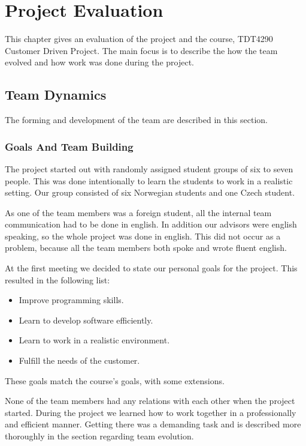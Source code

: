 \chapter{Project Evaluation}
This chapter gives an evaluation of the project and the course, TDT4290 Customer Driven Project. The main focus is to describe the how the team evolved and how work was done during the project.   

\section{Team Dynamics}
The forming and development of the team are described in this section.
\subsection{Goals And Team Building}
The project started out with randomly assigned student groups of six to seven people. This was done intentionally to learn the students to work in a realistic setting. Our group consisted of six Norwegian students and one Czech student. 

As one of the team members was a foreign student, all the internal team communication had to be done in english. In addition our advisors were english speaking, so the whole project was done in english. This did not occur as a problem, because all the team members both spoke and wrote fluent english.

At the first meeting we decided to state our personal goals for the project. This resulted in the following list:
\begin{itemize}
	\item Improve programming skills.
	\item Learn to develop software efficiently.
	\item Learn to work in a realistic environment.
	\item Fulfill the needs of the customer. 
\end{itemize}
These goals match the course's goals, with some extensions.

None of the team members had any relations with each other when the project started. During the project we learned how to work together in a professionally and efficient manner. Getting there was a demanding task and is described more thoroughly in the section regarding team evolution.

